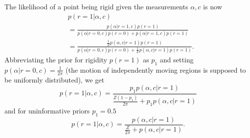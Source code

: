 \documentclass[10pt,twocolumn,letterpaper]{article}
\begin{document}
The likelihood of a point being rigid given the measurements $\alpha, c$ is now
\begin{align}
& p(r=1 \vert \alpha, c) \nonumber \\
&=
\frac{ p(\alpha \vert r=1, c) p(r=1)}
{p(\alpha \vert r=0, c) p(r=0) + p(\alpha \vert r=1, c) p(r=1) } \nonumber \\
&=
\frac{ \frac{1}{Z} p(\alpha, c \vert r=1) p(r=1)}
{p(\alpha \vert r=0, c) p(r=0) + \frac{1}{Z} p(\alpha, c \vert r=1) p(r=1) } .
\end{align}
Abbreviating the prior for rigidity $p(r=1)$ as $p_1$ and setting $p(\alpha \vert r=0, c) = \frac{1}{2\pi}$ (the motion of independently moving regions is supposed to be uniformly distributed), we get
\begin{equation}
p(r=1 \vert \alpha, c) = 
\frac{ p_1 p(\alpha, c \vert r=1)}
{\frac{Z (1-p_1)}{2\pi} + p_1 p(\alpha, c \vert r=1)}
\end{equation}
and for uninformative priors $p_1 = 0.5$
\begin{equation}
p(r=1 \vert \alpha, c) = 
\frac{ p(\alpha, c \vert r=1)}
{\frac{Z}{2\pi} + p(\alpha, c \vert r=1)} .
\label{eq:p_rigid}
\end{equation}
\end{document}
